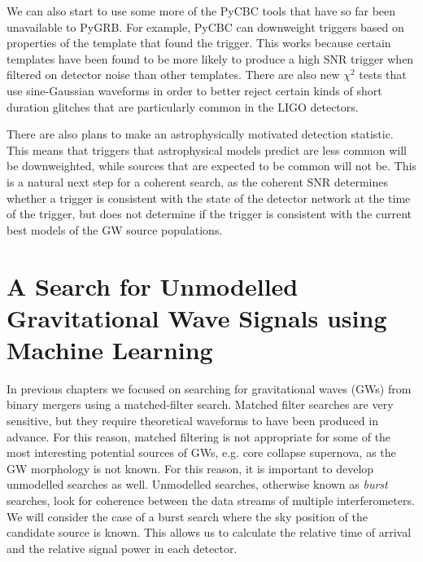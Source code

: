 \documentclass[11pt]{cuthesis}
\begin{document}
We can also start to use some more of the PyCBC tools that have so far been unavailable to PyGRB. For example, PyCBC can downweight triggers based on properties of the template that found the trigger. \cite{pycbc_Nitz:2017} This works because certain templates have been found to be more likely to produce a high SNR trigger when filtered on detector noise than other templates. There are also new $\chi^2$ tests that use sine-Gaussian waveforms in order to better reject certain kinds of short duration glitches that are particularly common in the LIGO detectors. \cite{Nitz:2017lco}

There are also plans to make an astrophysically motivated detection statistic. This means that triggers that astrophysical models predict are less common will be downweighted, while sources that are expected to be common will not be. This is a natural next step for a coherent search, as the coherent SNR determines whether a trigger is consistent with the state of the detector network at the time of the trigger, but does not determine if the trigger is consistent with the current best models of the GW source populations.


\chapter{A Search for Unmodelled Gravitational Wave Signals using Machine Learning} \label{chap: mva}

In previous chapters we focused on searching for gravitational waves (GWs) from binary mergers using a matched-filter search. Matched filter searches are very sensitive, but they require theoretical waveforms to have been produced in advance. For this reason, matched filtering is not appropriate for some of the most interesting potential sources of GWs, e.g. core collapse supernova, as the GW morphology is not known. For this reason, it is important to develop unmodelled searches as well. Unmodelled searches, otherwise known as \textit{burst} searches,\cite{xpipeline,omicron,CWB} look for coherence between the data streams of multiple interferometers. We will consider the case of a burst search where the sky position of the candidate source is known. This allows us to calculate the relative time of arrival and the relative signal power in each detector.
\end{document}
